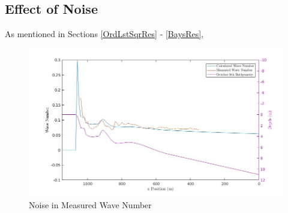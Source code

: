 \subsection{Effect of Noise}
\label{EffctOfNoise}

As mentioned in Sections \ref{OrdLstSqrRes} - \ref{BaysRes}, 

\begin{figure}[H]
\center
\includegraphics[scale=0.46]{img/Real_vs_Calcd_wavenum.jpg} 
\caption{Noise in Measured Wave Number}
\label{effectivewavenumbernoise}
\end{figure}
